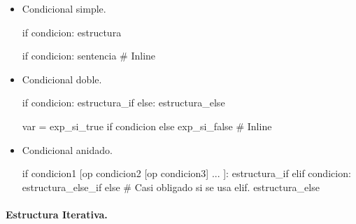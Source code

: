 \begin{itemize}
\item Condicional simple. 


\hfil
\begin{minipage}{.3\textwidth}
\begin{pyverbatim}[][frame=single, fontsize=\footnotesize]
if condicion:
    estructura
\end{pyverbatim}
\end{minipage} 
\begin{minipage}{.3\textwidth}
\begin{pyverbatim}[][frame=single, fontsize=\footnotesize]
if condicion: sentencia  # Inline
\end{pyverbatim}
\end{minipage}


\item Condicional doble. 


\hfil
\begin{minipage}{.3\textwidth}
\begin{pyverbatim}[][frame=single, fontsize=\footnotesize]
if condicion:
    estructura_if
else:
    estructura_else
\end{pyverbatim}
\end{minipage}
\begin{minipage}{.5\textwidth}
\begin{pyverbatim}[][frame=single, fontsize=\scriptsize]
var = exp_si_true  if  condicion else exp_si_false # Inline
\end{pyverbatim}
\end{minipage}



\item Condicional anidado.

\hfil
\begin{minipage}{.5\textwidth}
\begin{pyverbatim}[][frame=single, fontsize=\footnotesize]
if condicion1 [op condicion2 [op condicion3] ... ]:
    estructura_if
elif condicion:
    estructura_else_if
else  # Casi obligado si se usa elif.
    estructura_else
\end{pyverbatim}
\end{minipage}

\end{itemize}




\paragraph{Estructura Iterativa.}


